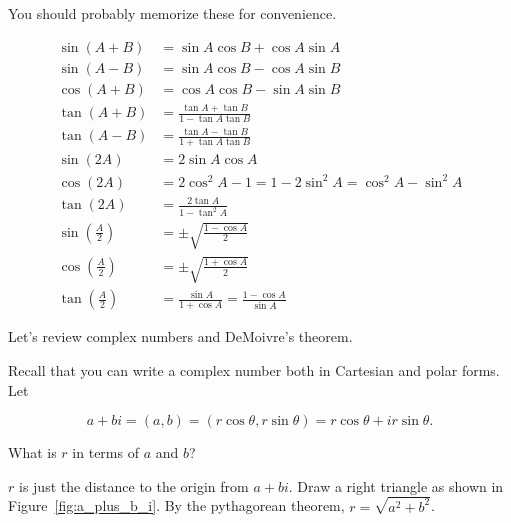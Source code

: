 \documentclass[../key.tex]{subfiles}
\begin{document}
\noindent You should probably memorize these for convenience.

\renewcommand{\arraystretch}{1.1}
\begin{align*}
\sin(A+B)&= \sin A \cos B + \cos A \sin A \\
\sin(A-B) &= \sin A \cos B - \cos A \sin B \\
\cos(A+B) &= \cos A \cos B - \sin A \sin B \\
\tan(A+B)&= \frac{\tan A + \tan B}{1-\tan A\tan B}\\
\tan(A-B) &= \frac{\tan A - \tan B}{1+\tan A\tan B}\\
\sin(2A) &= 2\sin A\cos A\\
\cos(2A)&= 2\cos^2 A - 1 = 1 - 2\sin^2 A = \cos^2 A - \sin^2 A \\
\tan(2A) &= \frac{2\tan A}{1-\tan^2 A}\\
\sin\left(\frac{A}{2}\right) &= \pm\sqrt{\frac{1-\cos A}{2}}\\
\cos\left(\frac{A}{2}\right)&= \pm\sqrt{\frac{1+\cos A}{2}}\\
\tan\left(\frac{A}{2}\right) &= \frac{\sin A}{1+\cos A} = \frac{1-\cos A}{\sin A}
\end{align*}

\begin{outer_problem}
\item Let's review complex numbers and DeMoivre's theorem.
\end{outer_problem}

\begin{inner_problem}[start=1]
\item Recall that you can write a complex number both in Cartesian and polar forms. Let

$$a+bi=(a,b)=(r\cos\theta,r\sin\theta)=r\cos\theta+ir\sin\theta.$$

What is $r$ in terms of $a$ and $b$?
\end{inner_problem}

\noindent $r$ is just the distance to the origin from $a+bi$. Draw a right triangle as shown in Figure~\ref{fig:a_plus_b_i}. By the pythagorean theorem, $r=\sqrt{a^2+b^2}$.
\end{document}
